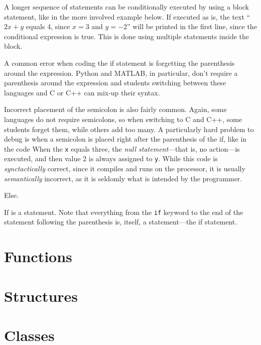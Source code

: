 A longer sequence of statements can be conditionally executed by using a block statement, like in the more involved example below.
If executed as is, the text ``$2x + y$ equals 4, since $x=3$ and $y=-2$'' will be printed in the first line, since the conditional expression is true.
This is done using multiple statements inside the block.


A common error when coding the if statement is forgetting the parenthesis around the expression.
Python and MATLAB, in particular, don't require a parenthesis around the expression and students switching between these languages and C or C++ can mix-up their syntax.

Incorrect placement of the semicolon is also fairly common.
Again, some languages do not require semicolons, so when switching to C and C++, some students forget them, while others add too many.
A particularly hard problem to debug is when a semicolon is placed right after the parenthesis of the if, like in the code 
When the \texttt{x} equals three, the \emph{null statement}---that is, no action---is executed, and then value 2 is always assigned to \texttt{y}.
While this code is \emph{synctactically} correct, since it compiles and runs on the processor, it is usually \emph{semantically} incorrect, as it is seldomly what is intended by the programmer.

\pending{}
Else. 

\pending{} If is a statement. 
Note that everything from the \texttt{if} keyword to the end of the statement following the parenthesis is, itself, a statement---the if statement.

\section{Functions}
\section{Structures}
\section{Classes}


